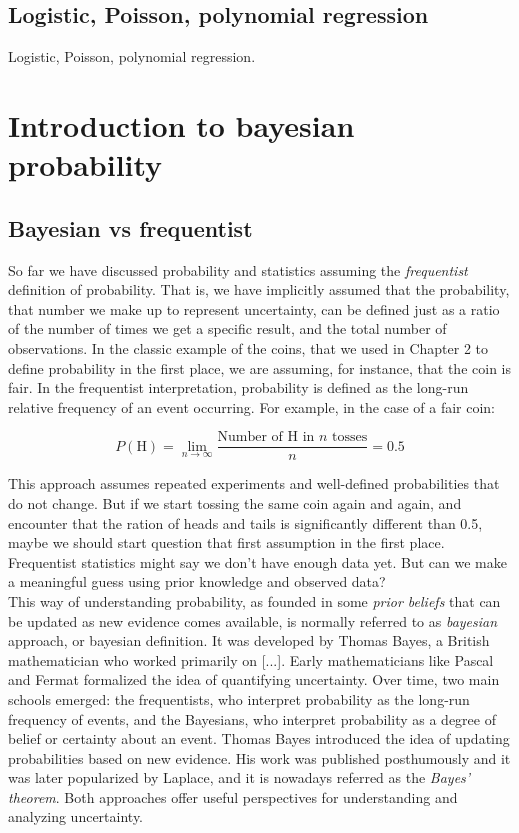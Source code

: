 \documentclass{book}
\begin{document}
\newpage

\section{Logistic, Poisson, polynomial regression}
Logistic, Poisson, polynomial regression.



\chapter{Introduction to bayesian probability}

\section{Bayesian vs frequentist}

So far we have discussed probability and statistics assuming the \textit{frequentist} definition of probability. That is, we have implicitly assumed that the probability, that number we make up to represent uncertainty, can be defined just as a ratio of the number of times we get a specific result, and the total number of observations. In the classic example of the coins, that we used in Chapter 2 to define probability in the first place, we are assuming, for instance, that the coin is fair. In the frequentist interpretation, probability is defined as the long-run relative frequency of an event occurring. For example, in the case of a fair coin:

\[
P(\text{H}) = \lim_{n \to \infty} \frac{\text{Number of H in } n \text{ tosses}}{n} = 0.5
\]

This approach assumes repeated experiments and well-defined probabilities that do not change. But if we start tossing the same coin again and again, and encounter that the ration of heads and tails is significantly different than 0.5, maybe we should start question that first assumption in the first place. Frequentist statistics might say we don't have enough data yet. But can we make a meaningful guess using prior knowledge and observed data? \\

This way of understanding probability, as founded in some \textit{prior beliefs} that can be updated as new evidence comes available, is normally referred to as \textit{bayesian} approach, or bayesian definition. It was developed by Thomas Bayes, a British mathematician who worked primarily on [...]. Early mathematicians like Pascal and Fermat formalized the idea of quantifying uncertainty. Over time, two main schools emerged: the frequentists, who interpret probability as the long-run frequency of events, and the Bayesians, who interpret probability as a degree of belief or certainty about an event. Thomas Bayes introduced the idea of updating probabilities based on new evidence. His work was published posthumously and it was later popularized by Laplace, and it is nowadays referred as the \textit{Bayes’ theorem}. Both approaches offer useful perspectives for understanding and analyzing uncertainty.\\
\end{document}
